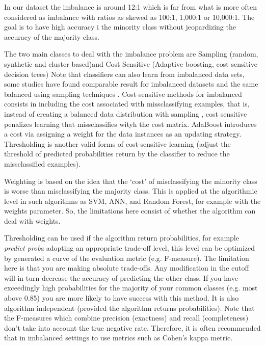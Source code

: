 \documentclass[12pt]{report}
\begin{document}
In our dataset the imbalance is around 12:1 which is far from what is more often considered as imbalance with ratios as skewed as 100:1, 1,000:1 or 10,000:1\cite{he2009learning}.
The goal is to have high accuracy i the minority class without jeopardizing  the accuracy of the majority class.

The two main classes to deal with the imbalance problem are Sampling (random, synthetic and cluster based)and Cost Sensitive (Adaptive boosting, cost sensitive decision trees) 
Note that classifiers can also learn from imbalanced data sets, some studies have found comparable result for imbalanced datasets and the same balanced using sampling techniques \cite{japkowicz2002class}.
Cost-sensitive methods for imbalanced consists in including the cost associated with missclassifying examples, that is, instead of creating a balanced data distribution with sampling , cost sensitive penalizes learning that missclassifies wityh the cost matrix. AdaBoost introduces a cost via assigning a weight for the data instances as an updating strategy. Thresholding is another valid forms of cost-sensitive learning (adjust the threshold of predicted probabilities return by the classifier to reduce the missclassified examples).

Weighting is based on the idea that the ‘cost’ of misclassifying the minority class is worse than misclassifying the majority  class. This is applied at the algorithmic level in such algorithms as SVM, ANN, and Random Forest, for example with the weights parameter. So, the limitations here consist of whether the algorithm can deal with weights.


Thresholding can be used if the algorithm return probabilities, for example \textit{predict proba} adopting an appropriate trade-off level, this level can be optimized by generated a curve of the evaluation metric (e.g. F-measure). The limitation here is that you are making absolute trade-offs. Any modification in the cutoff will in turn decrease the accuracy of predicting the other class. If you have exceedingly high probabilities for the majority of your common classes (e.g. most above 0.85) you are more likely to have success with this method. It is also algorithm independent (provided the algorithm returns probabilities).
Note that the F-measures which combine precision (exactness) and recall (completeness) don’t take into account the true negative rate. Therefore, it is often recommended that in imbalanced settings to use metrics such as Cohen’s kappa metric.
\end{document}
